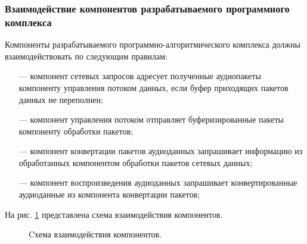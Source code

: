         \subsubsection{Взаимодействие компонентов разрабатываемого программного комплекса}
            \par Компоненты разрабатываемого программно-алгоритмического комплекса должны взаимодействовать по следующим правилам:
            \begin{itemize}
                \item[---] компонент сетевых запросов адресует полученные аудиопакеты компоненту управления потоком данных, 
                если буфер приходящих пакетов данных не переполнен;
                \item[---] компонент управления потоком отправляет буферизированные пакеты \newline компоненту обработки пакетов;
                \item[---] компонент конвертации пакетов аудиоданных запрашивает информацию из обработанных компонентом обработки пакетов сетевых данных;
                \item[---] компонент воспроизведения аудиоданных запрашивает конвертированные аудиоданные из компонента конвертации пакетов;
            \end{itemize}

            \par На рис. \ref{fig:audio-components} представлена схема взаимодействия компонентов.
            \begin{figure}[!h]
                \caption{Cхема взаимодействия компонентов.}
                \label{fig:audio-components}
            \end{figure}
        
